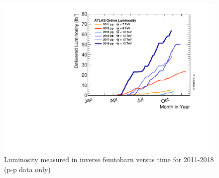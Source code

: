 \documentclass[a4paper, oneside]{book}
\begin{document}
					\begin{figure}
						\centering
						\includegraphics[width=0.5\textheight]{tesi_images/luminosity.pdf}
						\caption{Luminosity measured in inverse femtobarn versus time for 2011-2018 (p-p data only)}
						\label{fig:Integreted Luminosity}
					\end{figure}
					
\end{document}
